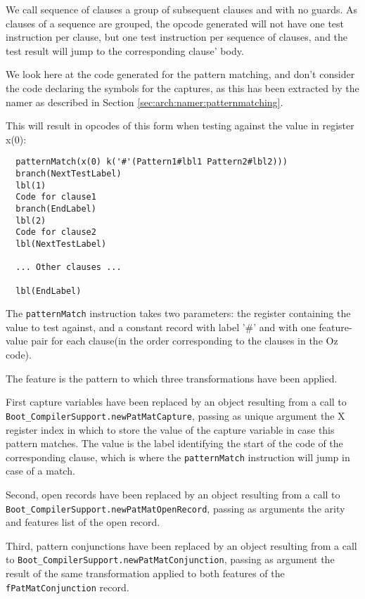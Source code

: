 \documentclass[a4paper]{memoir}
\begin{document}
We call sequence of clauses  a group of subsequent clauses and with no guards.
As clauses of a sequence are grouped, the opcode generated will not
have one test instruction per clause, but one test instruction
per sequence of clauses, and the test result will jump to the corresponding clause' body.

We look here at the code generated for the pattern matching, and don't consider
the code declaring the symbols for the captures, as this has been extracted by
the namer as described in Section \ref{sec:arch:namer:patternmatching}.

This will result in opcodes of this form when testing against the value in register x(0):
\begin{lstlisting}
  patternMatch(x(0) k('#'(Pattern1#lbl1 Pattern2#lbl2)))
  branch(NextTestLabel)
  lbl(1)
  Code for clause1
  branch(EndLabel)
  lbl(2)
  Code for clause2
  lbl(NextTestLabel)

  ... Other clauses ...

  lbl(EndLabel)
\end{lstlisting}

The \lstinline!patternMatch! instruction takes two parameters: the register containing the
value to test against, and a constant record with label '\#' and with one
feature-value pair for each clause(in the order corresponding to the clauses in the Oz code). 

The feature is the pattern to which three transformations have been applied. 

First capture variables have been replaced by an object resulting from a call to
\lstinline!Boot_CompilerSupport.newPatMatCapture!, passing as unique argument
the X register index in which to store the value of the capture variable in
case this pattern matches. The value is the label identifying the start of the
code of the corresponding clause, which is where the \lstinline!patternMatch! instruction
will jump in case of a match.

Second, open records have been replaced by an object resulting from a
call to \lstinline!Boot_CompilerSupport.newPatMatOpenRecord!, passing as
arguments the arity and features list of the open record.

Third, pattern conjunctions have been replaced by an object resulting from a call 
to \lstinline!Boot_CompilerSupport.newPatMatConjunction!, passing as argument the result
of the same transformation applied to both features of the \lstinline!fPatMatConjunction! record.
\end{document}
